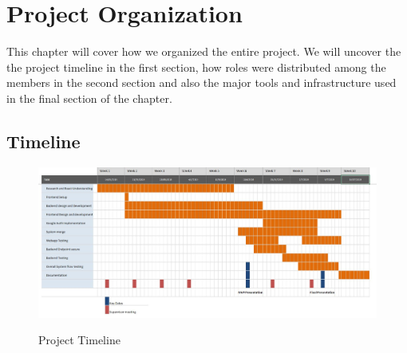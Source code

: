 \chapter{Project Organization}
\label{cha:projectorganization}


This chapter will cover how we organized the entire project. We will uncover the the project timeline in the first section, how roles were distributed among the members in the second section and also the major tools and infrastructure used in the final section of the chapter.
\section{Timeline}
\begin{figure}[!ht]
	\centering
	\includegraphics[width=1\textwidth]{images/Timeline.jpg}\\
	\caption{Project Timeline}
	\label{fig:Project Timeline}
\end{figure}

